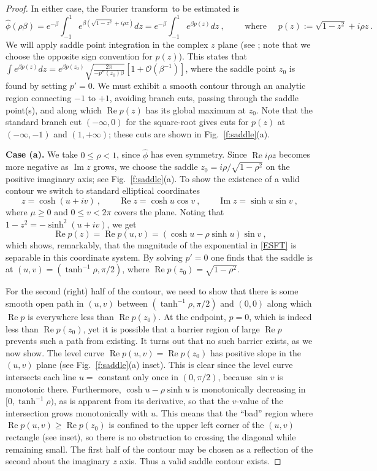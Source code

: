 \documentclass[10pt]{article}
\newcommand{\be}{\begin{equation}}
\newcommand{\ee}{\end{equation}}
\newcommand{\bigO}{{\mathcal O}}
\DeclareMathOperator{\re}{Re}
\DeclareMathOperator{\im}{Im}
\newcommand{\freq}{\beta}          %
\newcommand{\FT}{Fourier transform}
\begin{document}
\begin{proof}
In either case, the \FT\ to be estimated is
\be
\hat\phi(\rho\freq) = e^{-\freq} \int_{-1}^1
e^{\freq (\sqrt{1-z^2} + i\rho z)} dz
= e^{-\freq} \int_{-1}^1 e^{\freq p(z)} dz
~,\qquad\mbox{ where }\quad
p(z):=\sqrt{1-z^2} +i\rho z
~.
\label{ESFT}
\ee
We will apply saddle point integration in the
complex $z$ plane (see \cite[Thm.~7.1, p.~127]{olver};
note that we choose the opposite sign convention for $p(z)$).
This states that
$\int e^{\freq p(z)} dz = e^{\freq p(z_0)}\sqrt{\frac{2\pi}{-p''(z_0)\freq}}[1 + \bigO(\freq^{-1})]$,
where the saddle point $z_0$ is found by setting $p'=0$.
We must exhibit a smooth contour through an analytic region connecting $-1$
to $+1$, avoiding branch cuts,
passing through the saddle point(s), and along which $\re p(z)$
has its global maximum at $z_0$.
Note that the standard branch cut $(-\infty,0)$ for the square-root gives
cuts for $p(z)$ at $(-\infty,-1)$ and $(1,+\infty)$;
these cuts are shown in Fig.~\ref{f:saddle}(a).

{\bf Case (a).}
We take $0\le \rho<1$, since $\hat\phi$ has even symmetry.
Since $\re i\rho z$ becomes more negative as $\im z$ grows,
we choose the saddle $z_0 = i\rho/\sqrt{1-\rho^2}$ on the
positive imaginary axis; see Fig.~\ref{f:saddle}(a).
To show the existence of a valid contour we switch to standard elliptical
coordinates
\be
z = \cosh(u+iv)~,\qquad \re z = \cosh u \cos v~,\qquad \im z = \sinh u \sin v
~,
\label{ellip}
\ee
where $\mu\ge 0$ and $0\le v < 2\pi$ covers the plane.
Noting that $1-z^2 = -\sinh^2(u+iv)$, we get
\be
\re p(z) = \re p(u,v) = (\cosh u - \rho \sinh u) \sin v
~,
\label{repz}
\ee
which shows, remarkably, that the magnitude of the exponential
in \eqref{ESFT} is %
separable in this coordinate system.
By solving $p'=0$ one finds that the saddle is at
$(u,v) = (\tanh^{-1} \rho, \pi/2)$,
where $\re p(z_0) = \sqrt{1-\rho^2}$.

For the second (right) half of the contour,
we need to show that there is some smooth open path in $(u,v)$ between
$(\tanh^{-1} \rho, \pi/2)$ and $(0,0)$ along which $\re p$ is
everywhere less than $\re p(z_0)$.
At the endpoint, $p = 0$, which is indeed less than $\re p(z_0)$,
yet it is possible that a barrier region of large $\re p$
prevents such a path from existing.
It turns out that no such barrier exists, as we now show.
The level curve $\re p(u,v) =\re p(z_0)$ has positive slope
in the $(u,v)$ plane (see Fig.~\ref{f:saddle}(a) inset).
This is clear since the level curve intersects each line $u=$ constant
only once in $(0,\pi/2)$, because $\sin v$ is monotonic there.
Furthermore, $\cosh u - \rho \sinh u$ is monotonically
decreasing in $[0,\tanh^{-1} \rho)$, as is apparent from its derivative,
so that the $v$-value of the intersection grows monotonically
with $u$.
This means that the ``bad'' region where $\re p(u,v) \ge \re p(z_0)$ is
confined to the upper left corner of the $(u,v)$ rectangle
(see inset), so there is no obstruction to crossing the diagonal
while remaining small.
The first half of the contour
may be chosen as a reflection of the second about the imaginary $z$ axis.
Thus a valid saddle contour exists.


\end{proof}
\end{document}
